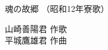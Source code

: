 \documentclass[10pt,b5j]{tarticle} %
\begin{document}
\begin{minipage}[c]{0.7\hsize} %
    \begin{center}
        {\LARGE
            魂の故郷 %
        }
        {\small 
            （昭和12年寮歌） %
        }
    \end{center}
\end{minipage}
\begin{minipage}[c]{0.3\hsize} %
    \begin{flushright} %
        山崎善陽君 作歌\\平城鷹雄君 作曲 %
    \end{flushright}
\end{minipage}
\end{document}

